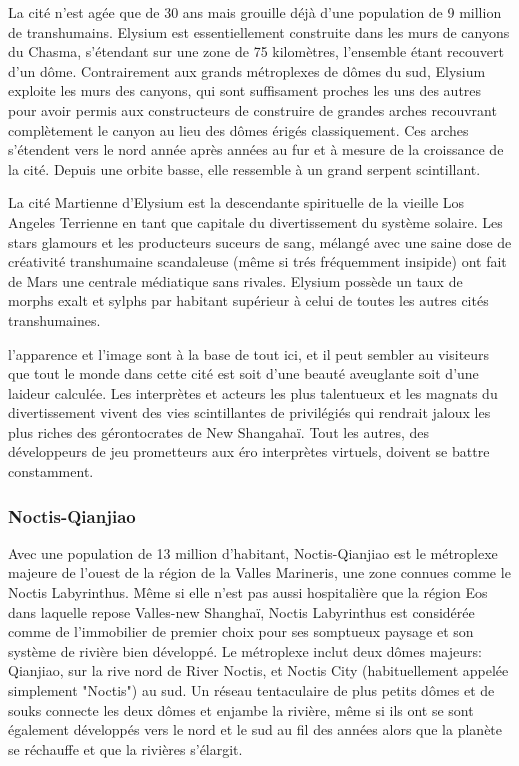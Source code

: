 La cité n'est agée que de 30 ans mais grouille déjà d'une population de 9 million de transhumains. Elysium est essentiellement construite dans les murs de canyons du Chasma, s'étendant sur une zone de 75 kilomètres, l'ensemble étant recouvert d'un dôme. Contrairement aux grands métroplexes de dômes du sud, Elysium exploite les murs des canyons, qui sont suffisament proches les uns des autres pour avoir permis aux constructeurs de construire de grandes arches recouvrant complètement le canyon au lieu des dômes érigés classiquement. Ces arches s'étendent vers le nord année après années au fur et à mesure de la croissance de la cité. Depuis une orbite basse, elle ressemble à un grand serpent scintillant. 

La cité Martienne d'Elysium est la descendante spirituelle de la vieille Los Angeles Terrienne en tant que capitale du divertissement du système solaire. Les stars glamours et les producteurs suceurs de sang, mélangé avec une saine dose de créativité transhumaine scandaleuse (même si trés fréquemment insipide) ont fait de Mars une centrale médiatique sans rivales. Elysium possède un taux de morphs exalt et sylphs par habitant supérieur à celui de toutes les autres cités transhumaines. 

l'apparence et l'image sont à la base de tout ici, et il peut sembler au visiteurs que tout le monde dans cette cité est soit d'une beauté aveuglante soit d'une laideur calculée. Les interprètes et acteurs les plus talentueux et les magnats du divertissement vivent des vies scintillantes de privilégiés qui rendrait jaloux les plus riches des gérontocrates de New Shangahaï. Tout les autres, des développeurs de jeu prometteurs aux éro interprètes virtuels, doivent se battre constamment. 

\subsubsection{Noctis-Qianjiao} \label{sec:noctis-qianjiao} 

Avec une population de 13 million d'habitant, Noctis-Qianjiao est le métroplexe majeure de l'ouest de la région de la Valles Marineris, une zone connues comme le Noctis Labyrinthus. Même si elle n'est pas aussi hospitalière que la région Eos dans laquelle repose Valles-new Shanghaï, Noctis Labyrinthus est considérée comme de l'immobilier de premier choix pour ses somptueux paysage et son système de rivière bien développé. Le métroplexe inclut deux dômes majeurs: Qianjiao, sur la rive nord de River Noctis, et Noctis City (habituellement appelée simplement "Noctis") au sud. Un réseau tentaculaire de plus petits dômes et de souks connecte les deux dômes et enjambe la rivière, même si ils ont se sont également développés vers le nord et le sud au fil des années alors que la planète se réchauffe et que la rivières s'élargit. 

